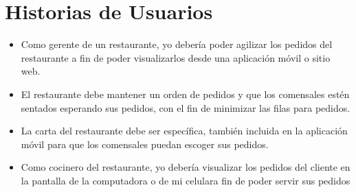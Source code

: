 \chapter{Historias de Usuarios}
\begin{itemize}
	\item Como gerente de un restaurante, yo debería poder agilizar los pedidos del restaurante a fin de poder visualizarlos desde una aplicación móvil o sitio web.
	\item El restaurante debe mantener un orden de pedidos y que los comensales estén sentados esperando sus pedidos, con el fin de minimizar las filas para pedidos.
	\item La carta del restaurante debe ser específica, también incluida en la aplicación móvil para que los comensales puedan escoger sus pedidos.
	\item Como cocinero del restaurante, yo debería visualizar los pedidos del cliente en la pantalla de la computadora o de mi celulara fin de poder servir sus pedidos\end{itemize}